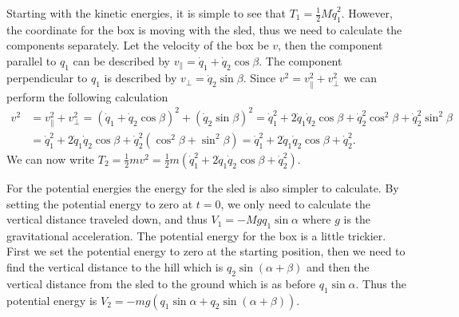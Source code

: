 Starting with the kinetic energies, it is simple to see that $T_1 = \frac{1}{2} M \dot{q}_1^2$. However, the coordinate for the box is moving with the sled, thus we need to calculate the components separately. Let the velocity of the box be $v$, then the component parallel to $q_1$ can be described by $v_\parallel = \dot{q}_1 + \dot{q}_2 \cos \beta$. The component perpendicular to $q_1$ is described by $v_\perp = \dot{q}_2 \sin \beta$. Since $v^2 = v_\parallel^2 + v_\perp^2$ we can perform the following calculation
\begin{align*}
    v^2 &= v_\parallel^2 + v_\perp^2 = (\dot{q}_1 + \dot{q}_2 \cos \beta)^2 + (\dot{q}_2 \sin \beta)^2 = \dot{q}_1^2 + 2 \dot{q}_1 \dot{q}_2 \cos \beta + \dot{q}_2^2 \cos^2 \beta + \dot{q}_2^2 \sin^2 \beta\\
    &= \dot{q}_1^2 + 2 \dot{q}_1 \dot{q}_2 \cos \beta + \dot{q}_2^2 (\cos^2 \beta + \sin^2 \beta) = \dot{q}_1^2 + 2 \dot{q}_1 \dot{q}_2 \cos \beta + \dot{q}_2^2.
\end{align*}
We can now write $T_2 = \frac{1}{2} m v^2 = \frac{1}{2} m (\dot{q}_1^2 + 2 \dot{q}_1 \dot{q}_2 \cos \beta + \dot{q}_2^2)$.

For the potential energies the energy for the sled is also simpler to calculate. By setting the potential energy to zero at $t=0$, we only need to calculate the vertical distance traveled down, and thus $V_1 = - M g q_1 \sin \alpha$ where $g$ is the gravitational acceleration. The potential energy for the box is a little trickier. First we set the potential energy to zero at the starting position, then we need to find the vertical distance to the hill which is $q_2 \sin (\alpha + \beta)$ and then the vertical distance from the sled to the ground which is as before $q_1 \sin \alpha$. Thus the potential energy is $V_2 = - m g (q_1 \sin \alpha + q_2 \sin(\alpha + \beta))$.

